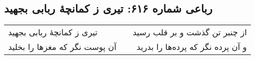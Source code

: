 \begin{center}
\section*{رباعی شماره ۶۱۶: تیری ز کمانچهٔ ربابی بجهید}
\label{sec:0616}
\begin{longtable}{l p{0.5cm} r}
تیری ز کمانچهٔ ربابی بجهید
&&
از چنبر تن گذشت و بر قلب رسید
\\
آن پوست نگر که مغزها را بخلید
&&
و آن پرده نگر که پرده‌ها را بدرید
\\
\end{longtable}
\end{center}
